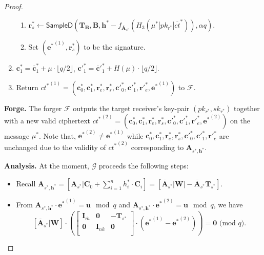 \documentclass[a4paper,11pt,onecolumn]{elsarticle}
\def\bf{\mathbf}
\begin{document}
\begin{proof}
\begin{enumerate}
\begin{enumerate}
			\item $\textbf{r}^*_s \leftarrow \textsf{SampleD}(\textbf{T}_{\textbf{B}}, \textbf{B},\textbf{h}^*-f_{\overline{\textbf{A}}_{s^*}}(H_3(\mu^*| pk_{r^*}|\overline{ct}^*)),\alpha q)$.
	
				\item Set $({\textbf{e}^*}^{(1)},{\textbf{r}_s^*})$ to be the signature.
										\end{enumerate}
		\item $\textbf{c}^*_1=\overline{\textbf{c}}^*_1+ \mu \cdot \lfloor q/2\rfloor$, \quad $\textbf{c}'^*_1=\overline{\textbf{c}}'^*_1+ H(\mu) \cdot \lfloor q/2\rfloor$.
		\item Return ${ct^*}^{(1)}=({\textbf{c}^*_0}, {\textbf{c}^*_1}, {\textbf{r}^*_e},  {\textbf{r}^*_s}, {\textbf{c}'^*_0}, {\textbf{c}'^*_1},{\textbf{r}'^*_e}, {\textbf{e}^*}^{(1)})$ to $\mathcal{F}$.
									\end{enumerate}
						
							
				
				
			 \textbf{Forge.} The forger $\mathcal{F}$  outputs the target receiver's key-pair $(pk_{r^*}, sk_{r^*})$ together with a new valid ciphertext ${ct^*}^{(2)}=({\textbf{c}^*_0}, {\textbf{c}^*_1}, {\textbf{r}^*_e},  {\textbf{r}^*_s}, {\textbf{c}'^*_0}, {\textbf{c}'^*_1},{\textbf{r}'^*_e}, {\textbf{e}^*}^{(2)})$ on the message $\mu^*$. Note that, ${\textbf{e}^*}^{(2)}\neq { \textbf{e}^*}^{(1)}$ while ${\textbf{c}^*_0}, {\textbf{c}^*_1}, {\textbf{r}^*_e},  {\textbf{r}^*_s}, {\textbf{c}'^*_0}, {\textbf{c}'^*_1},{\textbf{r}'^*_e}$ are unchanged due to the validity of ${ct^*}^{(2)}$ corresponding to $\textbf{A}_{s^*,\textbf{h}^*}$.
				
			\textbf{Analysis.} At the moment, $\mathcal{G}$ proceeds the following steps: 
				\begin{itemize}
				
					\item Recall $\textbf{A}_{{s^*},\textbf{h}^*}=[\mathbf{A}_{s^*}|\mathbf{C}_0+\sum_{i=1}^{n}h^*_i\cdot \mathbf{C}_i]=[\overline{\textbf{A}}_{s^*}|\textbf{W}|-\overline{\textbf{A}}_{s^*}\textbf{T}_{s^*}]$.
					\item From  $\textbf{A}_{{s^*},\textbf{h}^*}\cdot{\textbf{e}^*}^{(1)}=\textbf{u}\!\! \mod q$ and $\textbf{A}_{s^*,\textbf{h}^*}\cdot {\textbf{e}^*}^{(2)}=\textbf{u} \!\! \mod q$, we have
		$$[\overline{\textbf{A}}_{s^*}|\textbf{W}] \cdot \left(\begin{bmatrix}
		\mathbf{I}_{\overline{m}} & \textbf{0} &-\mathbf{T}_{s^*} \\
		\textbf{0}&\textbf{I}_{nk}& \textbf{0}\\
		\end{bmatrix} \cdot ({\textbf{e}^*}^{(1)}-{\textbf{e}^*}^{(2)})\right)=\bf{0} \text{ (mod } q).$$
		

\end{itemize}
\end{proof}
\end{document}
